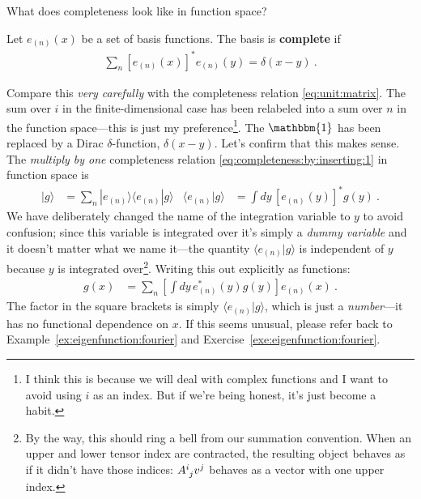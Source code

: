 What does completeness look like in function space?
\begin{framed}\noindent
Let $e_{(n)}(x)$ be a set of basis functions. The basis is \textbf{complete} if
\begin{align}
	\sum_n \left[e_{(n)}(x)\right]^* e_{(n)}(y) = \delta(x-y) \ .
	\label{eq:function:space:completeness}
\end{align}
\end{framed}
Compare this \emph{very carefully} with the completeness relation \eqref{eq:unit:matrix}. The sum over $i$ in the finite-dimensional case has been relabeled into a sum over $n$ in the function space---this is just my preference\footnote{I think this is because we will deal with complex functions and I want to avoid using $i$ as an index. But if we're being honest, it's just become a habit.}. The $\mathbbm{1}$ has been replaced by a Dirac $\delta$-function, $\delta(x-y)$. Let's confirm that this makes sense. The \emph{multiply by one} completeness relation \eqref{eq:completeness:by:inserting:1} in function space is
\begin{align}
	|g\rangle 
	&= 
	\sum_n |e_{(n)}\rangle\langle e_{(n)}| g\rangle
	&
	\langle e_{(n)}| g\rangle &=
	\int dy \, [e_{(n)}(y)]^* g(y) \ .
\end{align}
We have deliberately changed the name of the integration variable to $y$ to avoid confusion; since this variable is integrated over it's simply a \emph{dummy variable} and it doesn't matter what we name it---the quantity $\langle e_{(n)}|g\rangle$ is independent of $y$ because $y$ is integrated over\footnote{By the way, this should ring a bell from our summation convention. When an upper and lower tensor index are contracted, the resulting object behaves as if it didn't have those indices: $\mat{A}{i}{j}v^j$ behaves as a vector with one upper index.}. Writing this out explicitly as functions:
\begin{align}
	g(x) &= \sum_n\left[\int dy\, e_{(n)}^*(y)g(y)\right] e_{(n)}(x) \ .
	\label{eq:complenesss:function:space:in:action }
\end{align}
The factor in the square brackets is simply $\langle e_{(n)}| g\rangle$, which is just a \emph{number}---it has no functional dependence on $x$.
If this seems unusual, please refer back to Example~\ref{ex:eigenfunction:fourier} and Exercise~\ref{exe:eigenfunction:fourier}. 

